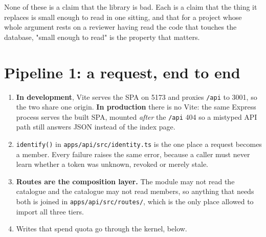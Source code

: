 \documentclass[11pt,a4paper]{article}
\begin{document}
\begin{careful}
None of these is a claim that the library is bad. Each is a claim that the
thing it replaces is small enough to read in one sitting, and that for a
project whose whole argument rests on a reviewer having read the code that
touches the database, "small enough to read" is the property that matters.
\end{careful}

\newpage
\section{Pipeline 1: a request, end to end}

\begin{center}
\end{center}

\begin{enumerate}[leftmargin=*]
  \item \textbf{In development}, Vite serves the SPA on 5173 and proxies
        \texttt{/api} to 3001, so the two share one origin. \textbf{In
        production} there is no Vite: the same Express process serves the
        built SPA, mounted \emph{after} the \texttt{/api} 404 so a mistyped API
        path still answers JSON instead of the index page.
  \item \texttt{identify()} in \texttt{apps/api/src/identity.ts} is the one
        place a request becomes a member. Every failure raises the same error,
        because a caller must never learn whether a token was unknown, revoked
        or merely stale.
  \item \textbf{Routes are the composition layer.} The module may not read the
        catalogue and the catalogue may not read members, so anything that
        needs both is joined in \texttt{apps/api/src/routes/}, which is the
        only place allowed to import all three tiers.
  \item Writes that spend quota go through the kernel, below.
\end{enumerate}
\end{document}
